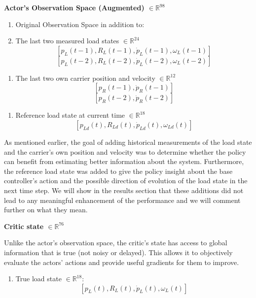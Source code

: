 \noindent\textbf{Actor's Observation Space (Augmented) $\in \mathbb{R}^{98}$}

\begin{enumerate}
  \item Original Observation Space in addition to:
  \item The last two measured load states $\in \mathbb{R}^{24}$
  \[
    [p_L(t-1), R_L(t-1), \dot{p}_L(t-1), \omega_L(t-1)]
  \]
  \[
    [p_L(t-2), R_L(t-2), \dot{p}_L(t-2), \omega_L(t-2)]
  \]
\end{enumerate}

\begin{enumerate}[resume]
  \item The last two own carrier position and velocity $\in
  \mathbb{R}^{12}$
  \[
    [p_R(t-1), \dot{p}_R(t-1)]
  \]
  \[
    [p_R(t-2), \dot{p}_R(t-2)]
  \]
\end{enumerate}

\begin{enumerate}[resume]
  \item Reference load state at current time $\in \mathbb{R}^{18}$
  \[
    [p_{Ld}(t), R_{Ld}(t), \dot{p}_{Ld}(t), \omega_{Ld}(t)]
  \]
\end{enumerate}

As mentioned earlier, the goal of adding historical measurements of the
load state and the carrier’s own position and velocity was to determine
whether the policy can benefit from estimating better information about
the system. Furthermore, the reference load state was added to give the
policy insight about the base controller’s action and the possible
direction of evolution of the load state in the next time step. We will
show in the results section that these additions did not lead to any
meaningful enhancement of the performance and we will comment further
on what they mean.

\noindent\textbf{Critic state $\in \mathbb{R}^{76}$}

Unlike the actor’s observation space, the critic’s state has access to
global information that is true (not noisy or delayed). This allows it
to objectively evaluate the actors’ actions and provide useful gradients
for them to improve.

\begin{enumerate}
  \item True load state $\in \mathbb{R}^{18}$:
  \[
    [p_L(t), R_L(t), \dot{p}_L(t), \omega_L(t)]
  \]
\end{enumerate}

